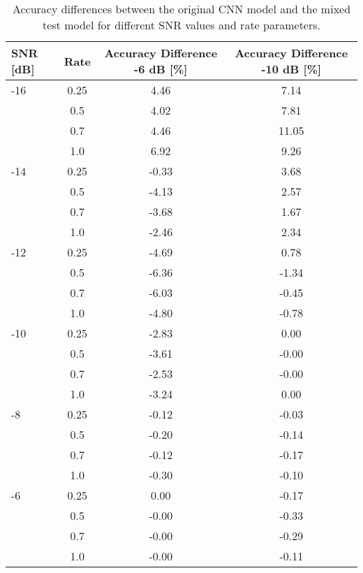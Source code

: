\begin{table}[ht]
\centering
\begin{tabular}{lccc}
\toprule
SNR [dB] & Rate & Accuracy Difference -6 dB [\%] & Accuracy Difference -10 dB [\%] \\
\midrule
-16 & 0.25 & 4.46 & 7.14 \\
 & 0.5 & 4.02 & 7.81 \\
 & 0.7 & 4.46 & 11.05 \\
 & 1.0 & 6.92 & 9.26 \\
\midrule
-14 & 0.25 & -0.33 & 3.68 \\
 & 0.5 & -4.13 & 2.57 \\
 & 0.7 & -3.68 & 1.67 \\
 & 1.0 & -2.46 & 2.34 \\
\midrule
-12 & 0.25 & -4.69 & 0.78 \\
 & 0.5 & -6.36 & -1.34 \\
 & 0.7 & -6.03 & -0.45 \\
 & 1.0 & -4.80 & -0.78 \\
\midrule
-10 & 0.25 & -2.83 & 0.00 \\
 & 0.5 & -3.61 & -0.00 \\
 & 0.7 & -2.53 & -0.00 \\
 & 1.0 & -3.24 & 0.00 \\
\midrule
-8 & 0.25 & -0.12 & -0.03 \\
 & 0.5 & -0.20 & -0.14 \\
 & 0.7 & -0.12 & -0.17 \\
 & 1.0 & -0.30 & -0.10 \\
\midrule
-6 & 0.25 & 0.00 & -0.17 \\
 & 0.5 & -0.00 & -0.33 \\
 & 0.7 & -0.00 & -0.29 \\
 & 1.0 & -0.00 & -0.11 \\
\midrule
\bottomrule
\end{tabular}
\caption{Accuracy differences between the original CNN model and the mixed test model for different SNR values and rate parameters.}
\label{tab:accuracy_diff}
\end{table}
